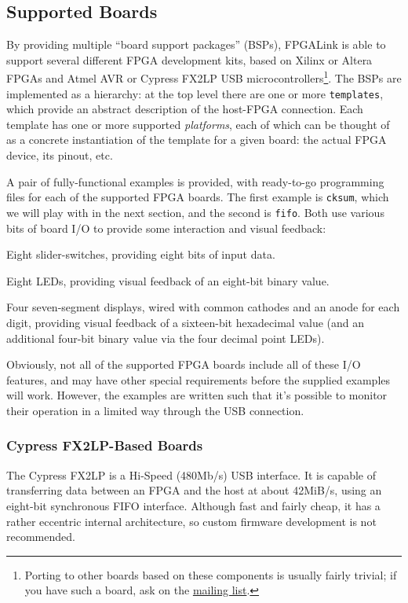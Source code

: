 \subsection{Supported Boards}
By providing multiple ``board support packages'' (BSPs), FPGALink is able to support several different FPGA development kits, based on Xilinx or Altera FPGAs and Atmel AVR or Cypress FX2LP USB microcontrollers\footnote{Porting to other boards based on these components is usually fairly trivial; if you have such a board, ask on the \href{http://groups.google.com/group/fpgalink-users}{mailing list}.}. The BSPs are implemented as a hierarchy: at the top level there are one or more \texttt{templates}, which provide an abstract description of the host-FPGA connection. Each template has one or more supported \textit{platforms}, each of which can be thought of as a concrete instantiation of the template for a given board: the actual FPGA device, its pinout, etc.

A pair of fully-functional examples is provided, with ready-to-go programming files for each of the supported FPGA boards. The first example is \texttt{cksum}, which we will play with in the next section, and the second is \texttt{fifo}. Both use various bits of board I/O to provide some interaction and visual feedback:

\begin{blobs}
  \item
    Eight slider-switches, providing eight bits of input data.
  \item
    Eight LEDs, providing visual feedback of an eight-bit binary value.
  \item
    Four seven-segment displays, wired with common cathodes and an anode for each digit, providing visual feedback of a sixteen-bit hexadecimal value (and an additional four-bit binary value via the four decimal point LEDs).
\end{blobs}

Obviously, not all of the supported FPGA boards include all of these I/O features, and may have other special requirements before the supplied examples will work. However, the examples are written such that it's possible to monitor their operation in a limited way through the USB connection.

\subsubsection{Cypress FX2LP-Based Boards}

The Cypress FX2LP is a Hi-Speed (480Mb/s) USB interface. It is capable of transferring data between an FPGA and the host at about 42MiB/s, using an eight-bit synchronous FIFO interface. Although fast and fairly cheap, it has a rather eccentric internal architecture, so custom firmware development is not recommended.

